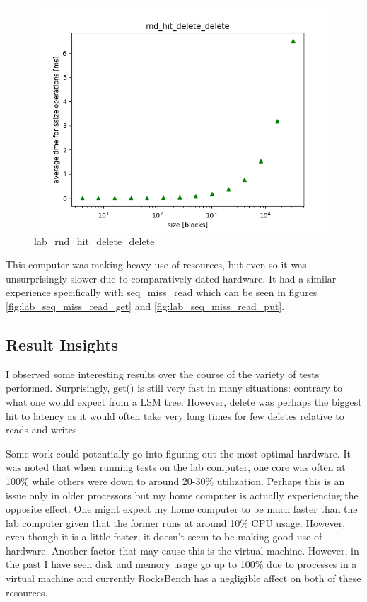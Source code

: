 \documentclass[twocolumn,11pt]{article}
\begin{document}
\begin{figure}[H]
  \includegraphics[width=\linewidth]{Pictures/LABPC/rnd_hit_delete_complete_delete.png}
  \caption{lab\_rnd\_hit\_delete\_delete}
  \label{fig:lab_rnd_hit_delete_delete}
\end{figure}



This computer was making heavy use of resources, but even so it was
unsurprisingly slower due to comparatively dated hardware. It had a similar
experience specifically with seq\_miss\_read which can be seen in figures
\ref{fig:lab_seq_miss_read_get} and \ref{fig:lab_seq_miss_read_put}.

\subsection{Result Insights}
\label{subsec:res_insights}

I observed some interesting results over the course of the variety of tests
performed. Surprisingly, get() is still very fast in many situations: contrary
to what one would expect from a LSM tree. However, delete was perhaps the
biggest hit to latency as it would often take very long times for few deletes
relative to reads and writes

Some work could potentially go into figuring out the most optimal hardware. It
was noted that when running tests on the lab computer, one core was often at
100\% while others were down to around 20-30\% utilization. Perhaps this is an
issue only in older processors but my home computer is actually experiencing the
opposite effect. One might expect my home computer to be much faster than the
lab computer given that the former runs at around 10\% CPU usage. However, even
though it is a little faster, it doesn't seem to be making good use of hardware.
Another factor that may cause this is the virtual machine. However, in the past
I have seen disk and memory usage go up to 100\% due to processes in a virtual
machine and currently RocksBench has a negligible affect on both of these
resources.
\end{document}
